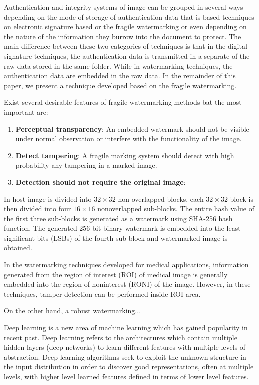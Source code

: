 \documentclass[runningheads]{llncs}
\begin{document}
Authentication and integrity systems of image can be grouped in several ways depending on the mode of storage of authentication data that is based techniques on electronic signature based or the fragile watermarking or even depending on the nature of the information they burrow into the document to protect. The main difference between these two categories of techniques is that in the digital signature techniques, the authentication data is transmitted in a separate of the raw data stored in the same folder. While in watermarking techniques, the authentication data are embedded in the raw data. In the remainder of this paper, we present a technique developed based on the fragile watermarking. \cite{boujemaa2016fragile}

Exist several desirable features of fragile watermarking methods bat the most important are:

\begin{enumerate}
	\item \textbf{Perceptual transparency}: An embedded watermark should not be visible under normal observation or interfere	with the functionality of the image.
	\item \textbf{Detect tampering}: A fragile marking system should detect with high probability any tampering in a marked image.
	\item \textbf{Detection should not require the original image}:
\end{enumerate}

In \cite{gul2019novel} host image is divided into $32\times 32$ non-overlapped blocks, each $32\times 32$ block is then divided into four $16\times 16$ nonoverlapped sub-blocks. The entire hash value of the first three sub-blocks is generated as a watermark using SHA-256 hash function. The generated 256-bit binary watermark is embedded into the least significant bits (LSBs) of the fourth sub-block and watermarked image is obtained.

In the watermarking techniques developed for medical applications, information generated from the region of interest (ROI) of medical image is generally embedded into the region of noninterest (RONI) of the image. However, in these
techniques, tamper detection can be performed inside ROI area.

On the other hand, a robust watermarking...

Deep learning is a new area of machine learning which has gained popularity in recent past. Deep learning refers to the architectures which contain multiple hidden layers (deep networks) to learn different features with multiple levels of abstraction. Deep learning algorithms seek to exploit the unknown structure in the input distribution in order to discover good representations, often at multiple levels, with higher level learned features defined in terms of lower level features. \cite{wani2019advances}
\end{document}
